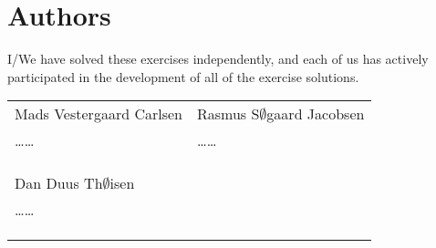 \documentclass{article}
\begin{document}
\newpage
\section{Authors}
I/We have solved these exercises independently, and each of us has actively
participated in the development of all of the exercise solutions.
\vspace{1cm}

\noindent
\begin{tabular}{p{70mm}p{70mm}}

%
%

Mads Vestergaard Carlsen & Rasmus S$\emptyset$gaard Jacobsen \\
\dots\dotfill\dots & \dots\dotfill\dots \\
 &  \\
& \\
& \\

Dan Duus Th$\emptyset$isen &  \\
\dots\dotfill\dots &  \\
&  \\
& \\
& \\
\end{tabular}
\end{document}
